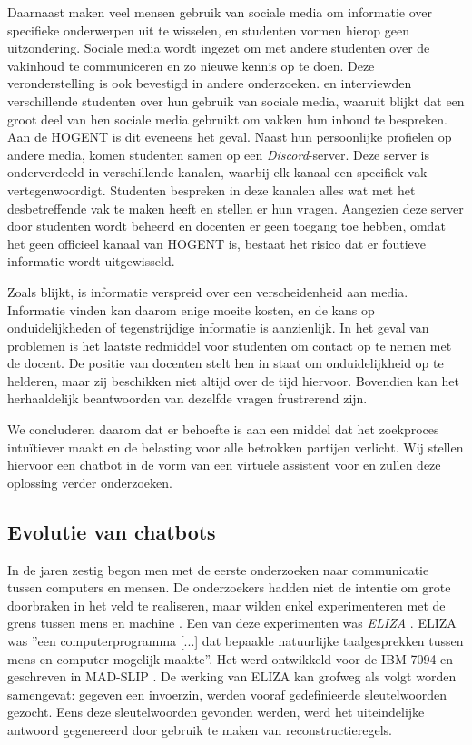 Daarnaast maken veel mensen gebruik van sociale media om informatie over specifieke onderwerpen uit te wisselen, en studenten vormen hierop geen uitzondering. Sociale media wordt ingezet om met andere studenten over de vakinhoud te communiceren en zo nieuwe kennis op te doen. Deze veronderstelling is ook bevestigd in andere onderzoeken. \textcite{M.Talaue2018} en \textcite{Bal2017} interviewden verschillende studenten over hun gebruik van sociale media, waaruit blijkt dat een groot deel van hen sociale media gebruikt om vakken hun inhoud te bespreken. Aan de HOGENT is dit eveneens het geval. Naast hun persoonlijke profielen op andere media, komen studenten samen op een \emph{Discord}-server. Deze server is onderverdeeld in verschillende kanalen, waarbij elk kanaal een specifiek vak vertegenwoordigt. Studenten bespreken in deze kanalen alles wat met het desbetreffende vak te maken heeft en stellen er hun vragen. Aangezien deze server door studenten wordt beheerd en docenten er geen toegang toe hebben, omdat het geen officieel kanaal van HOGENT is, bestaat het risico dat er foutieve informatie wordt uitgewisseld. 

Zoals blijkt, is informatie verspreid over een verscheidenheid aan media. Informatie vinden kan daarom enige moeite kosten, en de kans op onduidelijkheden of tegenstrijdige informatie is aanzienlijk. In het geval van problemen is het laatste redmiddel voor studenten om contact op te nemen met de docent. De positie van docenten stelt hen in staat om onduidelijkheid op te helderen, maar zij beschikken niet altijd over de tijd hiervoor. Bovendien kan het herhaaldelijk beantwoorden van dezelfde vragen frustrerend zijn.

We concluderen daarom dat er behoefte is aan een middel dat het zoekproces intuïtiever maakt en de belasting voor alle betrokken partijen verlicht. Wij stellen hiervoor een chatbot in de vorm van een virtuele assistent voor en zullen deze oplossing verder onderzoeken.


\subsection{Evolutie van chatbots}
\label{sec:chatbots}

In de jaren zestig begon men met de eerste onderzoeken naar communicatie tussen computers en mensen. De onderzoekers hadden niet de intentie om grote doorbraken in het veld te realiseren, maar wilden enkel experimenteren met de grens tussen mens en machine \autocite{Dibitonto2018, AbuShawar2007}. Een van deze experimenten was \emph{ELIZA} \autocite{Weizenbaum1966}. ELIZA was ''een computerprogramma [...] dat bepaalde natuurlijke taalgesprekken tussen mens en computer mogelijk maakte''. Het werd ontwikkeld voor de IBM 7094 en geschreven in MAD-SLIP \autocite{Weizenbaum1966}. De werking van ELIZA kan grofweg als volgt worden samengevat: gegeven een invoerzin, werden vooraf gedefinieerde sleutelwoorden gezocht. Eens deze sleutelwoorden gevonden werden, werd het uiteindelijke antwoord gegenereerd door gebruik te maken van reconstructieregels. 

